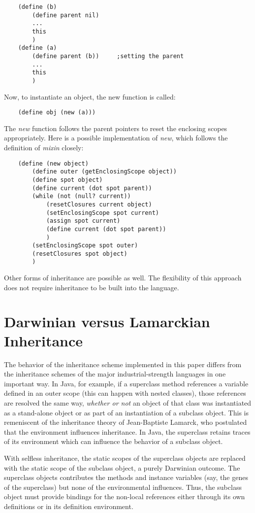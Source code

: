\begin{verbatim}
    (define (b)
        (define parent nil)
        ...
        this
        )
    (define (a)
        (define parent (b))     ;setting the parent 
        ...
        this
        )
\end{verbatim}

Now, to instantiate an object, the new function is called:

\begin{verbatim}
    (define obj (new (a)))
\end{verbatim}

The {\it new} function follows the parent pointers to reset the enclosing
scopes appropriately. Here is a possible implementation of {\it new},
which follows the definition of {\it mixin} closely:

\begin{verbatim}
    (define (new object)
        (define outer (getEnclosingScope object))
        (define spot object)
        (define current (dot spot parent))
        (while (not (null? current))
            (resetClosures current object)
            (setEnclosingScope spot current)
            (assign spot current)
            (define current (dot spot parent))
            )
        (setEnclosingScope spot outer)
        (resetClosures spot object)
        )
\end{verbatim}

Other forms of inheritance are possible as well. The flexibility of this
approach does not require inheritance to be built into the language.

\section{Darwinian versus Lamarckian Inheritance}

The behavior of the inheritance scheme implemented in this paper differs
from the inheritance schemes of the major industrial-strength languages
in one important way.  In Java, for example, if a superclass method
references a variable defined in an outer scope (this can happen
with nested classes), those references are resolved the same way,
{\it whether or not} an object of that class was instantiated as a
stand-alone object or as part of an instantiation of a subclass object.
This is remeniscent of the inheritance theory of Jean-Baptiste Lamarck,
who postulated that the environment influences inheritance. In Java,
the superclass retains traces of its environment which can influence
the behavior of a subclass object.

With selfless inheritance, the static scopes of the superclass objects
are replaced with the static scope of the subclass object, a purely
Darwinian outcome. The superclass objects contributes the methods
and instance variables (say, the genes of the superclass) but none of
the environmental influences.  Thus, the subclass object must provide
bindings for the non-local references either through its own definitions
or in its definition environment.
